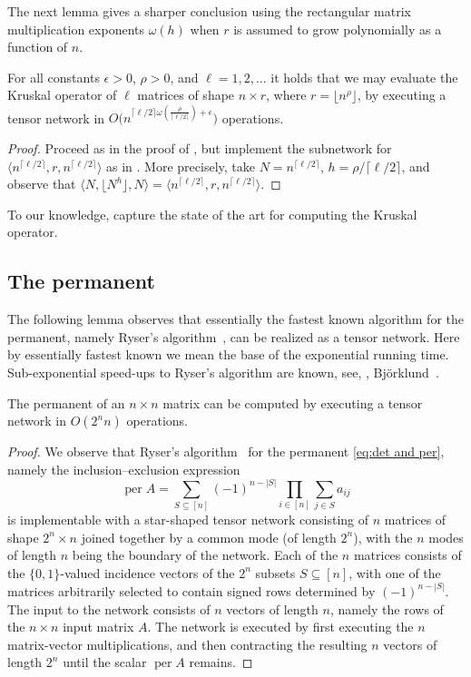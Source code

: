 \documentclass{toc}
\newcommand{\bra}{\ensuremath{\langle}}
\newcommand{\ket}{\ensuremath{\rangle}}
\newcommand{\per}{\ensuremath{\operatorname{per}}}
\begin{document}
The next lemma gives a sharper conclusion using the rectangular matrix
multiplication exponents $\omega(h)$ when $r$ is assumed to grow
polynomially as a function of $n$.

\begin{lemma}
\label{lem:kruskal-2}
For all constants $\epsilon>0$, $\rho>0$, and $\ell=1,2,\ldots$
it holds that we may evaluate the Kruskal operator
of $\ell$ matrices of shape $n\times r$, where $r=\lfloor n^\rho\rfloor$,
by executing a tensor network in
$O\bigl(n^{\lceil\ell/2\rceil\omega\left(\frac{\rho}{\lceil\ell/2\rceil}\right)+\epsilon}\bigr)$ operations.
\end{lemma}
\begin{proof}
Proceed as in the proof of , but implement the subnetwork
for $\bra n^{\lceil\ell/2\rceil},r,n^{\lceil\ell/2\rceil}\ket$ as in
.
More precisely, take $N=n^{\lceil\ell/2\rceil}$, $h=\rho/\lceil\ell/2\rceil$,
and observe that
$\bra N,\lfloor N^h\rfloor,N\ket=\bra n^{\lceil\ell/2\rceil},r,n^{\lceil\ell/2\rceil}\ket$.
\end{proof}

To our knowledge,
%
capture the state of the art for
computing the Kruskal operator.

\subsection{The permanent}

The following lemma observes that essentially the fastest known algorithm
for the permanent, namely Ryser's algorithm~\cite{Ryser1963}, can be
realized as a tensor network. Here by essentially fastest known we
mean the base of the exponential running time. Sub-exponential speed-ups
to Ryser's algorithm are known, see, \eg, Bj\"orklund~\cite{Bjorklund2016}.

\begin{lemma}
The permanent of an $n\times n$ matrix can be computed by executing
a tensor network in $O(2^nn)$ operations.
\end{lemma}
\begin{proof}
We observe that Ryser's algorithm~\cite{Ryser1963} for the
permanent \eqref{eq:det and per}, namely the inclusion--exclusion expression
\[
\per A=\sum_{S\subseteq [n]}(-1)^{n-|S|}\prod_{i\in [n]}\sum_{j\in S}a_{ij}
\]
is implementable with a star-shaped tensor network consisting of
$n$ matrices of shape $2^n\times n$ joined together by a common mode (of length $2^n$), with the $n$ modes of length $n$ being the boundary of the network.
Each of the $n$ matrices consists of the $\{0,1\}$-valued incidence vectors of
the $2^n$ subsets $S\subseteq [n]$, with one of the matrices arbitrarily
selected to contain signed rows determined by $(-1)^{n-|S|}$.
The input to the network consists of $n$ vectors of length $n$,
namely the rows of the $n\times n$ input matrix $A$. The network is executed
by first executing the $n$ matrix-vector multiplications, and then contracting
the resulting $n$ vectors of length $2^n$ until the scalar $\per A$ remains.
\end{proof}
\end{document}
